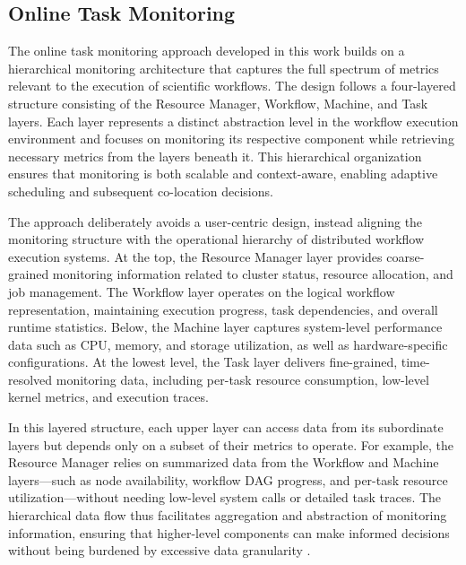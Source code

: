 \subsection{Online Task Monitoring}
\label{sec:online_task_monitoring}

The online task monitoring approach developed in this work builds on a hierarchical monitoring architecture that captures the full spectrum of metrics relevant to the execution of scientific workflows. The design follows a four-layered structure consisting of the Resource Manager, Workflow, Machine, and Task layers. Each layer represents a distinct abstraction level in the workflow execution environment and focuses on monitoring its respective component while retrieving necessary metrics from the layers beneath it. This hierarchical organization ensures that monitoring is both scalable and context-aware, enabling adaptive scheduling and subsequent co-location decisions.

The approach deliberately avoids a user-centric design, instead aligning the monitoring structure with the operational hierarchy of distributed workflow execution systems. At the top, the Resource Manager layer provides coarse-grained monitoring information related to cluster status, resource allocation, and job management. The Workflow layer operates on the logical workflow representation, maintaining execution progress, task dependencies, and overall runtime statistics. Below, the Machine layer captures system-level performance data such as CPU, memory, and storage utilization, as well as hardware-specific configurations. At the lowest level, the Task layer delivers fine-grained, time-resolved monitoring data, including per-task resource consumption, low-level kernel metrics, and execution traces.

In this layered structure, each upper layer can access data from its subordinate layers but depends only on a subset of their metrics to operate. For example, the Resource Manager relies on summarized data from the Workflow and Machine layers—such as node availability, workflow DAG progress, and per-task resource utilization—without needing low-level system calls or detailed task traces. The hierarchical data flow thus facilitates aggregation and abstraction of monitoring information, ensuring that higher-level components can make informed decisions without being burdened by excessive data granularity \cite{Bader_2022}.

